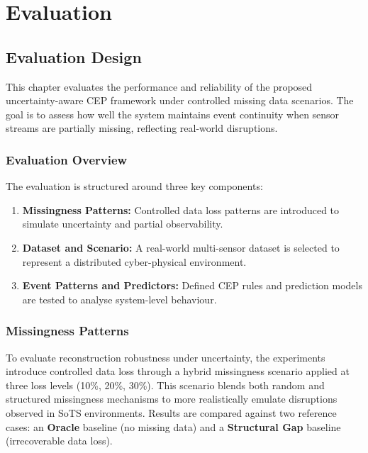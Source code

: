 \chapter{Evaluation }
\label{ch:results}

\section{Evaluation Design}
\label{sec:evaluation_design}

This chapter evaluates the performance and reliability of the proposed uncertainty-aware CEP framework under controlled missing data scenarios. The goal is to assess how well the system maintains event continuity when sensor streams are partially missing, reflecting real-world disruptions.

\subsection{Evaluation Overview}
The evaluation is structured around three key components:
\begin{enumerate}
    \item \textbf{Missingness Patterns:} Controlled data loss patterns are introduced to simulate uncertainty and partial observability.
    \item \textbf{Dataset and Scenario:} A real-world multi-sensor dataset is selected to represent a distributed cyber-physical environment.
    \item \textbf{Event Patterns and Predictors:} Defined CEP rules and prediction models are tested to analyse system-level behaviour.
\end{enumerate}



\subsection{Missingness Patterns}
\label{sec:missingness_patterns}

To evaluate reconstruction robustness under uncertainty, the experiments introduce controlled data loss through a hybrid missingness scenario applied at three loss levels (10\%, 20\%, 30\%). 
This scenario blends both random and structured missingness mechanisms to more realistically emulate disruptions observed in SoTS environments. 
Results are compared against two reference cases: an \textbf{Oracle} baseline (no missing data) and a \textbf{Structural Gap} baseline (irrecoverable data loss).

